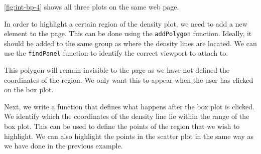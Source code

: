 \documentclass[11pt,]{report}
\newenvironment{Shaded}{\begin{snugshade}}{\end{snugshade}}
\newcommand{\KeywordTok}[1]{\textcolor[rgb]{0.13,0.29,0.53}{\textbf{#1}}}
\newcommand{\DataTypeTok}[1]{\textcolor[rgb]{0.13,0.29,0.53}{#1}}
\newcommand{\StringTok}[1]{\textcolor[rgb]{0.31,0.60,0.02}{#1}}
\newcommand{\CommentTok}[1]{\textcolor[rgb]{0.56,0.35,0.01}{\textit{#1}}}
\newcommand{\OperatorTok}[1]{\textcolor[rgb]{0.81,0.36,0.00}{\textbf{#1}}}
\newcommand{\NormalTok}[1]{#1}
\begin{document}
\autoref{fig:int-bp-4} shows all three plots on the same web page.

In order to highlight a certain region of the density plot, we need to
add a new element to the page. This can be done using the
\texttt{addPolygon} function. Ideally, it should be added to the same
group as where the density lines are located. We can use the
\texttt{findPanel} function to identify the correct viewport to attach
to.

\begin{Shaded}
\end{Shaded}

This polygon will remain invisible to the page as we have not defined
the coordinates of the region. We only want this to appear when the user
has clicked on the box plot.

Next, we write a function that defines what happens after the box plot
is clicked. We identify which the coordinates of the density line lie
within the range of the box plot. This can be used to define the points
of the region that we wish to highlight. We can also highlight the
points in the scatter plot in the same way as we have done in the
previous example.
\end{document}
